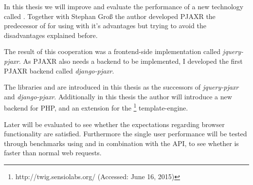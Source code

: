 In this thesis we will improve and evaluate the performance of a new technology called \lare{}.
Together with Stephan Gro{\ss} the author developed PJAXR the predecessor of \lare{} for using \ajax{} with it's advantages but trying to avoid the disadvantages explained before.

The result of this cooperation was a frontend-side implementation called \emph{jquery-pjaxr}.
As PJAXR also needs a backend to be implemented, I developed the first PJAXR backend called \emph{django-pjaxr}.

The libraries \lareJS{} and \djangoLare{} are introduced in this thesis as the successors of \emph{jquery-pjaxr} and \emph{django-pjaxr}.
Additionally in this thesis the author will introduce a new \lare{} backend for PHP, \emph{\phpLare{}} and \emph{\twigLare{}} an extension for the \twig{}\footnote{http://twig.sensiolabs.org/ (Accessed: June 16, 2015)} template-engine.

Later \lare{} will be evaluated to see whether the expectations regarding browser functionality are satisfied.
Furthermore the single user performance will be tested through benchmarks using \curl{} and \selenium{} in combination with the \webdriver{} API, to see whether \lare{} is faster than normal web requests.
